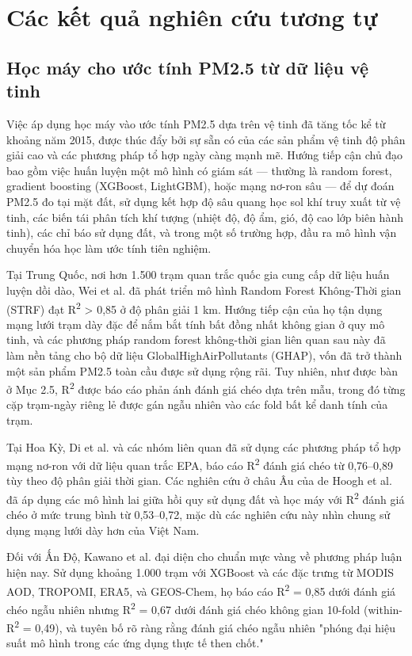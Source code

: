 \section{Các kết quả nghiên cứu tương tự}

\subsection{Học máy cho ước tính PM2.5 từ dữ liệu vệ tinh}

Việc áp dụng học máy vào ước tính PM2.5 dựa trên vệ tinh đã tăng tốc kể từ khoảng năm 2015, được thúc đẩy bởi sự sẵn có của các sản phẩm vệ tinh độ phân giải cao và các phương pháp tổ hợp ngày càng mạnh mẽ. Hướng tiếp cận chủ đạo bao gồm việc huấn luyện một mô hình có giám sát --- thường là random forest, gradient boosting (XGBoost, LightGBM), hoặc mạng nơ-ron sâu --- để dự đoán PM2.5 đo tại mặt đất, sử dụng kết hợp độ sâu quang học sol khí truy xuất từ vệ tinh, các biến tái phân tích khí tượng (nhiệt độ, độ ẩm, gió, độ cao lớp biên hành tinh), các chỉ báo sử dụng đất, và trong một số trường hợp, đầu ra mô hình vận chuyển hóa học làm ước tính tiên nghiệm.

Tại Trung Quốc, nơi hơn 1.500 trạm quan trắc quốc gia cung cấp dữ liệu huấn luyện dồi dào, Wei et al. đã phát triển mô hình Random Forest Không-Thời gian (STRF) đạt R\textsuperscript{2} > 0,85 ở độ phân giải 1 km. Hướng tiếp cận của họ tận dụng mạng lưới trạm dày đặc để nắm bắt tính bất đồng nhất không gian ở quy mô tinh, và các phương pháp random forest không-thời gian liên quan sau này đã làm nền tảng cho bộ dữ liệu GlobalHighAirPollutants (GHAP), vốn đã trở thành một sản phẩm PM2.5 toàn cầu được sử dụng rộng rãi. Tuy nhiên, như được bàn ở Mục 2.5, R\textsuperscript{2} được báo cáo phản ánh đánh giá chéo dựa trên mẫu, trong đó từng cặp trạm-ngày riêng lẻ được gán ngẫu nhiên vào các fold bất kể danh tính của trạm.

Tại Hoa Kỳ, Di et al. và các nhóm liên quan đã sử dụng các phương pháp tổ hợp mạng nơ-ron với dữ liệu quan trắc EPA, báo cáo R\textsuperscript{2} đánh giá chéo từ 0,76--0,89 tùy theo độ phân giải thời gian. Các nghiên cứu ở châu Âu của de Hoogh et al. đã áp dụng các mô hình lai giữa hồi quy sử dụng đất và học máy với R\textsuperscript{2} đánh giá chéo ở mức trung bình từ 0,53--0,72, mặc dù các nghiên cứu này nhìn chung sử dụng mạng lưới dày hơn của Việt Nam.

Đối với Ấn Độ, Kawano et al. \cite{kawano2025} đại diện cho chuẩn mực vàng về phương pháp luận hiện nay. Sử dụng khoảng 1.000 trạm với XGBoost và các đặc trưng từ MODIS AOD, TROPOMI, ERA5, và GEOS-Chem, họ báo cáo R\textsuperscript{2} = 0,85 dưới đánh giá chéo ngẫu nhiên nhưng R\textsuperscript{2} = 0,67 dưới đánh giá chéo không gian 10-fold (within-R\textsuperscript{2} = 0,49), và tuyên bố rõ ràng rằng đánh giá chéo ngẫu nhiên "phóng đại hiệu suất mô hình trong các ứng dụng thực tế then chốt."

